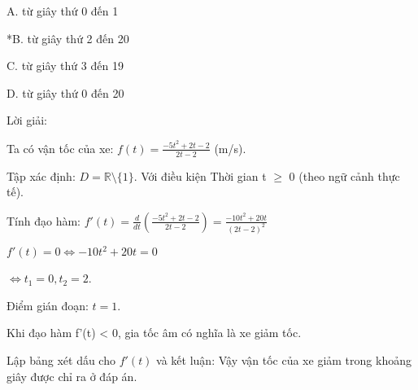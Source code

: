 \documentclass[a4paper,12pt]{article}
\begin{document}
A. từ giây thứ 0 đến 1

*B. từ giây thứ 2 đến 20

C. từ giây thứ 3 đến 19

D. từ giây thứ 0 đến 20

Lời giải:

Ta có vận tốc của xe: \(f(t) = \frac{-5t^2+2t-2}{2t-2}\) (m/s).

Tập xác định: \(D = \mathbb{R} \setminus \{1\}\).
Với điều kiện Thời gian t $\geq$ 0 (theo ngữ cảnh thực tế).

Tính đạo hàm:
\(f'(t) = \frac{d}{dt}\left(\frac{-5t^2+2t-2}{2t-2}\right) = \frac{-10t^2+20t}{\left(2t-2\right)^2}\)

\(f'(t) = 0 \Leftrightarrow -10t^2+20t = 0\)

\(\Leftrightarrow t_1 = 0, t_2 = 2\).

Điểm gián đoạn: \(t = 1\).

Khi đạo hàm f'(t) < 0, gia tốc âm có nghĩa là xe giảm tốc.

Lập bảng xét dấu cho \(f'(t)\) và kết luận: Vậy vận tốc của xe giảm trong khoảng giây được chỉ ra ở đáp án.
\end{document}
